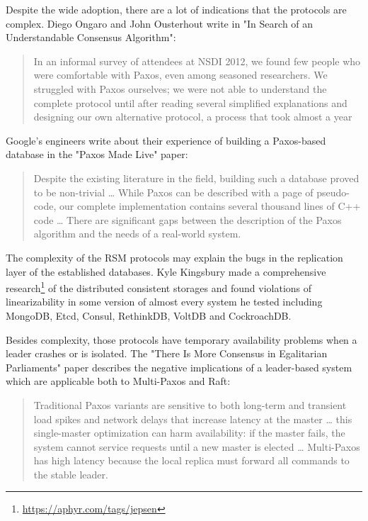 \documentclass[12pt]{article}
\theoremstyle{definition}
\begin{document}
Despite the wide adoption, there are a lot of indications that the protocols are complex. Diego Ongaro and John Ousterhout write in "In Search of an Understandable Consensus Algorithm"\cite{raft}:

\begin{quote}
In an informal survey of attendees at NSDI 2012, we found few people who were comfortable with Paxos, even among seasoned researchers. We struggled with Paxos ourselves; we were not able to understand the complete protocol until after reading several simplified explanations and designing our own alternative protocol, a process that took almost a year
\end{quote}

Google's engineers write about their experience of building a Paxos-based database in the "Paxos Made Live"\cite{chubby} paper:

\begin{quote}
Despite the existing literature in the field, building such a database proved to be non-trivial \ldots{} While Paxos can be described with a page of pseudo-code, our complete implementation contains several thousand lines of C++ code \ldots{} There are significant gaps between the description of the Paxos algorithm and the needs of a real-world system.
\end{quote}

The complexity of the RSM protocols may explain the bugs in the replication layer of the established databases. Kyle Kingsbury made a comprehensive research\footnote{\href{https://aphyr.com/tags/jepsen}{https://aphyr.com/tags/jepsen}} of the distributed consistent storages and found violations of linearizability in some version of almost every system he tested including MongoDB, Etcd, Consul, RethinkDB, VoltDB and CockroachDB.

Besides complexity, those protocols have temporary availability problems when a leader crashes or is isolated. The "There Is More Consensus in Egalitarian Parliaments" paper\cite{epaxos} describes the negative implications of a leader-based system which are applicable both to Multi-Paxos and Raft:

\begin{quote}
Traditional Paxos variants are sensitive to both long-term and transient load spikes and network delays that increase latency at the master \ldots{} this single-master optimization can harm availability: if the master fails, the system cannot service requests until a new master is elected \ldots{} Multi-Paxos has high latency because the local replica must forward all commands to the stable leader.
\end{quote}
\end{document}
